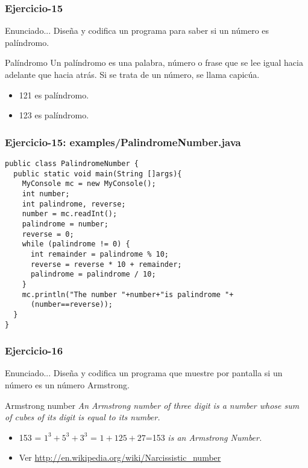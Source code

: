 \documentclass[xcolor=dvipsnames,dvip,notes=show,handout,table]{beamer}
\begin{document}
\begin{frame}[fragile]
\frametitle{Ejercicio-15}
\begin{block}{Enunciado...}
Diseña y codifica un programa para saber si un número es palíndromo.
\end{block}

\begin{exampleblock}{Palíndromo}
  Un palíndromo es una palabra, número o frase que se lee igual hacia adelante que hacia atrás. Si se trata de un número, se llama capicúa.
  \begin{itemize}
   \item 121 es palíndromo.
   \item 123 es palíndromo.
  \end{itemize}

\end{exampleblock}


\end{frame}


\begin{frame}[fragile]
\frametitle{Ejercicio-15: examples/PalindromeNumber.java}
\scriptsize
\begin{lstlisting}
public class PalindromeNumber {
  public static void main(String []args){
    MyConsole mc = new MyConsole();
    int number;
    int palindrome, reverse;
    number = mc.readInt();
    palindrome = number;
    reverse = 0;
    while (palindrome != 0) {
      int remainder = palindrome % 10;
      reverse = reverse * 10 + remainder;
      palindrome = palindrome / 10;
    }
    mc.println("The number "+number+"is palindrome "+ 
      (number==reverse));
  }
}
\end{lstlisting}
\end{frame}


\begin{frame}[fragile]
\frametitle{Ejercicio-16}
\begin{block}{Enunciado...}
Diseña y codifica un programa que muestre por pantalla si un número es un número Armstrong.
\end{block}

\begin{exampleblock}{Armstrong number}
\textit{ An Armstrong number of three digit is a number whose sum of cubes of its digit is equal to its number. }
  \begin{itemize}
   \item  153 = $1^3+5^3+3^3$ = $1+125+27$=153 \textit{is an Armstrong Number.}
   \item  Ver \url{http://en.wikipedia.org/wiki/Narcissistic\_number}
  \end{itemize}

\end{exampleblock}


\end{frame}
\end{document}
